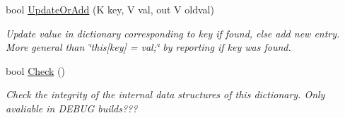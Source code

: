 \begin{DoxyCompactItemize}
$$bool \hyperlink{interface_c5_1_1_i_dictionary_abc8d5a032bbf487db18fc26e31ad512d}{Update\+Or\+Add} (K key, V val, out V oldval)
\begin{DoxyCompactList}\small\item\em Update value in dictionary corresponding to key if found, else add new entry. More general than \char`\"{}this\mbox{[}key\mbox{]} = val;\char`\"{} by reporting if key was found. \end{DoxyCompactList}\item 
bool \hyperlink{interface_c5_1_1_i_dictionary_a659969044740981cdcfe5ee86585104c}{Check} ()
\begin{DoxyCompactList}\small\item\em Check the integrity of the internal data structures of this dictionary. Only avaliable in D\+E\+B\+U\+G builds??? \end{DoxyCompactList}\end{DoxyCompactItemize}
